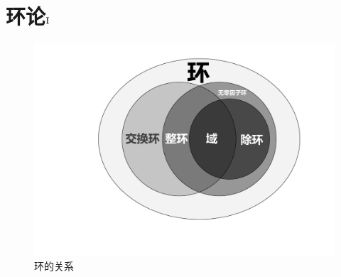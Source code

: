 % 

% 
	
\chapter{环论$\rm\Rmnum{1}$}

\begin{figure}[H]
	\centering
	\includegraphics[scale = 0.4]{../figure/环}
	\caption{环的关系}
\end{figure}

